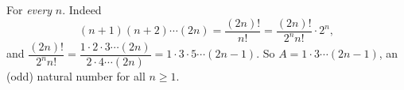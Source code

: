 For \emph{every} $n$. Indeed
\[(n+1)(n+2)\cdots(2n)=\dfrac{(2n)!}{n!}=\dfrac{(2n)!}{2^nn!}\cdot2^n,\]
and $\dfrac{(2n)!}{2^nn!}=\dfrac{1\cdot2\cdot3\cdots(2n)}{2\cdot4\cdots(2n)}=1\cdot3\cdot5\cdots(2n-1)$. So $A=1\cdot3\cdots(2n-1)$, an (odd) natural number for all $n\ge1$.
